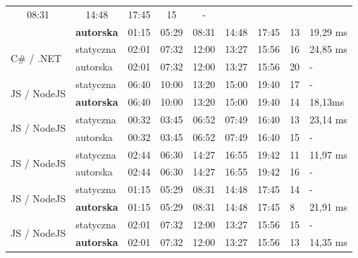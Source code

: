 \begin{table}[H]
{\begin{tabular}{|l|l|ccccc|l|l|}
  \multicolumn{1}{c|}{08:31} &
  \multicolumn{1}{c|}{14:48} &
  17:45 &
  15 &
  - \\ \cline{2-9} 
 &
  \textbf{autorska} &
  \multicolumn{1}{c|}{01:15} &
  \multicolumn{1}{c|}{05:29} &
  \multicolumn{1}{c|}{08:31} &
  \multicolumn{1}{c|}{14:48} &
  17:45 &
  13 &
  19,29 ms \\ \hline
\multirow{2}{*}{C\# / .NET} &
  statyczna &
  \multicolumn{1}{c|}{02:01} &
  \multicolumn{1}{c|}{07:32} &
  \multicolumn{1}{c|}{12:00} &
  \multicolumn{1}{c|}{13:27} &
  15:56 &
  16 &
  24,85 ms \\ \cline{2-9} 
 &
  autorska &
  \multicolumn{1}{c|}{02:01} &
  \multicolumn{1}{c|}{07:32} &
  \multicolumn{1}{c|}{12:00} &
  \multicolumn{1}{c|}{13:27} &
  15:56 &
  20 &
  - \\ \hline
\multirow{2}{*}{JS / NodeJS} &
  statyczna &
  \multicolumn{1}{c|}{06:40} &
  \multicolumn{1}{c|}{10:00} &
  \multicolumn{1}{c|}{13:20} &
  \multicolumn{1}{c|}{15:00} &
  19:40 &
  17 &
  - \\ \cline{2-9} 
 &
  \textbf{autorska} &
  \multicolumn{1}{c|}{06:40} &
  \multicolumn{1}{c|}{10:00} &
  \multicolumn{1}{c|}{13:20} &
  \multicolumn{1}{c|}{15:00} &
  19:40 &
  14 &
  18,13ms \\ \hline
\multirow{2}{*}{JS / NodeJS} &
  statyczna &
  \multicolumn{1}{c|}{00:32} &
  \multicolumn{1}{c|}{03:45} &
  \multicolumn{1}{c|}{06:52} &
  \multicolumn{1}{c|}{07:49} &
  16:40 &
  13 &
  23,14 ms \\ \cline{2-9} 
 &
  autorska &
  \multicolumn{1}{c|}{00:32} &
  \multicolumn{1}{c|}{03:45} &
  \multicolumn{1}{c|}{06:52} &
  \multicolumn{1}{c|}{07:49} &
  16:40 &
  15 &
  - \\ \hline
\multirow{2}{*}{JS / NodeJS} &
  statyczna &
  \multicolumn{1}{c|}{02:44} &
  \multicolumn{1}{c|}{06:30} &
  \multicolumn{1}{c|}{14:27} &
  \multicolumn{1}{c|}{16:55} &
  19:42 &
  11 &
  11,97 ms \\ \cline{2-9} 
 &
  autorska &
  \multicolumn{1}{c|}{02:44} &
  \multicolumn{1}{c|}{06:30} &
  \multicolumn{1}{c|}{14:27} &
  \multicolumn{1}{c|}{16:55} &
  19:42 &
  16 &
  - \\ \hline
\multirow{2}{*}{JS / NodeJS} &
  statyczna &
  \multicolumn{1}{c|}{01:15} &
  \multicolumn{1}{c|}{05:29} &
  \multicolumn{1}{c|}{08:31} &
  \multicolumn{1}{c|}{14:48} &
  17:45 &
  14 &
  - \\ \cline{2-9} 
 &
  \textbf{autorska} &
  \multicolumn{1}{c|}{01:15} &
  \multicolumn{1}{c|}{05:29} &
  \multicolumn{1}{c|}{08:31} &
  \multicolumn{1}{c|}{14:48} &
  17:45 &
  8 &
  21,91 ms \\ \hline
\multirow{2}{*}{JS / NodeJS} &
  statyczna &
  \multicolumn{1}{c|}{02:01} &
  \multicolumn{1}{c|}{07:32} &
  \multicolumn{1}{c|}{12:00} &
  \multicolumn{1}{c|}{13:27} &
  15:56 &
  15 &
  - \\ \cline{2-9} 
 &
  \textbf{autorska} &
  \multicolumn{1}{c|}{02:01} &
  \multicolumn{1}{c|}{07:32} &
  \multicolumn{1}{c|}{12:00} &
  \multicolumn{1}{c|}{13:27} &
  15:56 &
  13 &
  14,35 ms \\ \hline
\end{tabular}%
}
\end{table}

